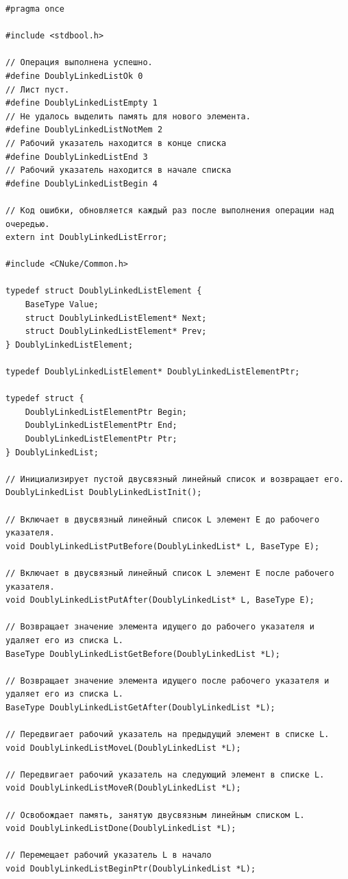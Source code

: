 \documentclass[a4paper,14pt]{extarticle}
\begin{document}
\begin{enumerate}
\begin{verbatim}
#pragma once

#include <stdbool.h>

// Операция выполнена успешно.
#define DoublyLinkedListOk 0
// Лист пуст.
#define DoublyLinkedListEmpty 1
// Не удалось выделить память для нового элемента.
#define DoublyLinkedListNotMem 2
// Рабочий указатель находится в конце списка
#define DoublyLinkedListEnd 3
// Рабочий указатель находится в начале списка
#define DoublyLinkedListBegin 4

// Код ошибки, обновляется каждый раз после выполнения операции над очередью.
extern int DoublyLinkedListError;

#include <CNuke/Common.h>

typedef struct DoublyLinkedListElement {
    BaseType Value;
    struct DoublyLinkedListElement* Next;
    struct DoublyLinkedListElement* Prev;
} DoublyLinkedListElement;

typedef DoublyLinkedListElement* DoublyLinkedListElementPtr;

typedef struct {
    DoublyLinkedListElementPtr Begin;
    DoublyLinkedListElementPtr End;
    DoublyLinkedListElementPtr Ptr;
} DoublyLinkedList;

// Инициализирует пустой двусвязный линейный список и возвращает его.
DoublyLinkedList DoublyLinkedListInit();

// Включает в двусвязный линейный список L элемент E до рабочего указателя.
void DoublyLinkedListPutBefore(DoublyLinkedList* L, BaseType E);

// Включает в двусвязный линейный список L элемент E после рабочего указателя.
void DoublyLinkedListPutAfter(DoublyLinkedList* L, BaseType E);

// Возвращает значение элемента идущего до рабочего указателя и удаляет его из списка L.
BaseType DoublyLinkedListGetBefore(DoublyLinkedList *L);

// Возвращает значение элемента идущего после рабочего указателя и удаляет его из списка L.
BaseType DoublyLinkedListGetAfter(DoublyLinkedList *L);

// Передвигает рабочий указатель на предыдущий элемент в списке L.
void DoublyLinkedListMoveL(DoublyLinkedList *L);

// Передвигает рабочий указатель на следующий элемент в списке L.
void DoublyLinkedListMoveR(DoublyLinkedList *L);

// Освобождает память, занятую двусвязным линейным списком L.
void DoublyLinkedListDone(DoublyLinkedList *L);

// Перемещает рабочий указатель L в начало
void DoublyLinkedListBeginPtr(DoublyLinkedList *L);


\end{verbatim}
\end{enumerate}
\end{document}
